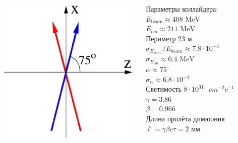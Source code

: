 \documentclass[10pt, pdf, hyperref={unicode}]{beamer}
\begin{document}
\begin{frame}
\begin{minipage}{\linewidth}
	\begin{columns}[T]
		\begin{column}{0.5\linewidth}
			\begin{flushleft}
				\includegraphics[width = 0.6\linewidth]{beams1.png}
			\end{flushleft}
		\end{column}

		\begin{column}{0.5\linewidth}
			Параметры коллайдера:\\
			$E_{\text{beam}} \approx 408\text{ MeV}$\\
			$E_{cm} \approx 211\text{ MeV}$\\
			Периметр $23\text{ м}$\\
			$\sigma_{E_{beam}}/E_{beam} \approx 7.8 \cdot 10^{-4}$\\
			$\sigma_{E_{cm}} \approx 0.4\text{ MeV}$\\
			$\alpha \approx 75^{\circ}$\\
			$\sigma_{\alpha} \approx 6.8 \cdot 10^{-4}$\\
			Светимость $8 \cdot 10^{31}\text{ $cm^{-2}c^{-1}$}$\\
			$\gamma = 3.86$\\
			$\beta = 0.966$\\
			Длина пролёта димюония $\ell = \gamma\beta c\tau = 2$ мм
		\end{column}
	\end{columns}
\end{minipage}
\end{frame}
\end{document}
